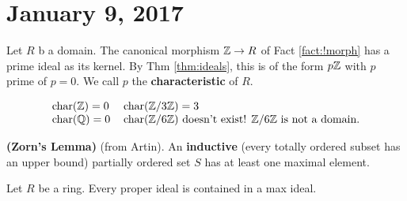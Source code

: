 \section{January 9, 2017}
\begin{defn}
    Let $R$ b a domain. The canonical morphism $\mathbb{Z} \rightarrow R$ of Fact \ref{fact:!morph} has
    a prime ideal as its kernel. By Thm \ref{thm:ideals}, this is of the form
    $p\mathbb{Z}$ with $p$ prime of $p = 0$. We call $p$ the \textbf{characteristic} of $R$.
\end{defn}
\begin{ex}
\[
\begin{tabular}{ll}
    char$(\ZZ) = 0$ & char$(\Zn 3) = 3$ \\
    char$(\QQ) = 0$ & char$(\Zn 6)$ doesn't exist! $\Zn 6 $ is not a domain.
\end{tabular}
\]
\end{ex}
\begin{unnumlemma}
\textbf{(Zorn's Lemma)} (from Artin). An \textbf{inductive} (every totally ordered
subset has an upper bound) partially ordered set $S$ has at least one maximal element.
\end{unnumlemma}
\begin{thm}\label{thm:maxext}
    Let $R$ be a ring. Every proper ideal is contained in a max ideal.
\end{thm}
